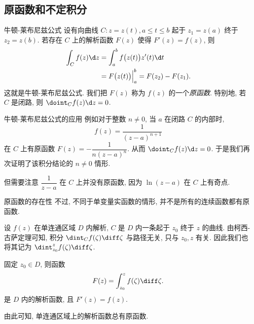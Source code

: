 \subsection{原函数和不定积分}


\begin{frame}{牛顿-莱布尼兹公式}
	\onslide<+->
	设有向曲线 $C:z=z(t),a\le t\le b$ 起于 $z_1=z(a)$ 终于 $z_2=z(b)$.
	\onslide<+->
	若存在 $C$ 上的解析函数 $F(z)$ 使得 $F'(z)=f(z)$, 则
	\begin{align*}
			\int_C f(z)\d z&
		=\int_a^b f\bigl(z(t)\bigr)z'(t)\d t\\&
		=F\bigl(z(t)\bigr)\Big|_a^b
		=F(z_2)-F(z_1).
	\end{align*}
	\onslide<+->
	这就是\alert{牛顿-莱布尼兹公式}.
	\onslide<+->
	我们把 $F(z)$ 称为 $f(z)$ 的一个\emph{原函数}.
	\onslide<+->
	特别地, 若 $C$ 是闭路, 则 $\doint_C f(z)\d z=0$.
\end{frame}


\begin{frame}{牛顿-莱布尼兹公式的应用}
	\onslide<+->
	例如对于整数 $n\neq0$, 当 $a$ 在闭路 $C$ 的内部时,
	\[
		f(z)=\dfrac1{(z-a)^{n+1}}
	\]
	在 $C$ 上有原函数 $F(z)=-\dfrac1{n(z-a)^n}$.
	\onslide<+->
	从而 $\doint_C f(z)\d z=0$. 
	\onslide<+->
	于是我们再次证明了该积分结论的 $n\neq0$ 情形.

	\onslide<+->
	但需要注意 $\dfrac1{z-a}$ 在 $C$ 上并没有原函数, 因为 $\ln(z-a)$ 在 $C$ 上有奇点.
\end{frame}


\begin{frame}{原函数的存在性}
	\onslide<+->
	不过, 不同于单变量实函数的情形, 并不是所有的连续函数都有原函数.

	\onslide<+->
	设 $f(z)$ 在单连通区域 $D$ 内解析, $C$ 是 $D$ 内一条起于 $z_0$ 终于 $z$ 的曲线.
	\onslide<+->
	由柯西-古萨定理可知, 积分 $\dint_Cf(\zeta)\diff \zeta$ 与路径无关, 只与 $z_0,z$ 有关.
	\onslide<+->
	因此我们也将其记为 $\dint_{z_0}^zf(\zeta)\diff\zeta$.
	\onslide<+->
	\begin{theorem}
		固定 $z_0\in D$, 则函数
		\[
			F(z)=\int_{z_0}^zf(\zeta)\diff\zeta.
		\]
		是 $D$ 内的解析函数, 且 $F'(z)=f(z)$.
	\end{theorem}
	\onslide<+->
	由此可知, \alert{单连通区域上的解析函数总有原函数}.
\end{frame}


